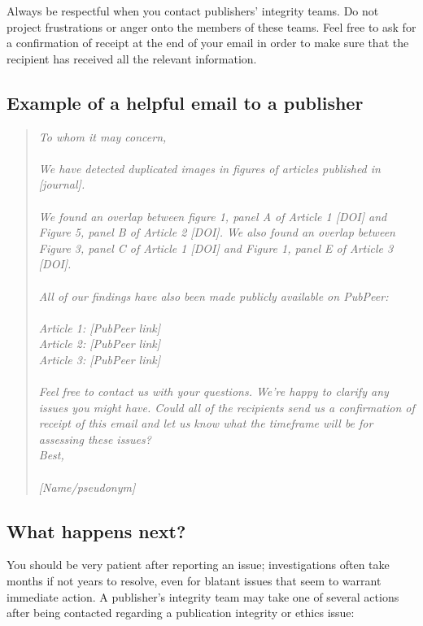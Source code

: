 \documentclass[letterpaper, 12pt]{article}
\begin{document}
Always be respectful when you contact publishers' integrity teams. Do not project frustrations or anger onto the members of these teams. Feel free to ask for a confirmation of receipt at the end of your email in order to make sure that the recipient has received all the relevant information.

\subsection*{Example of a helpful email to a publisher}

\begin{quote}
\textit{To whom it may concern,}\\
\indent\\
\textit{We have detected duplicated images in figures of articles published in [journal].}\\
\indent\\
\textit{We found an overlap between figure 1, panel A of Article 1 [DOI] and Figure 5, panel B of Article 2 [DOI]. We also found an overlap between Figure 3, panel C of Article 1 [DOI] and Figure 1, panel E of Article 3 [DOI].}\\
\indent\\
\textit{All of our findings have also been made publicly available on PubPeer:}\\
\indent\\
\textit{Article 1: [PubPeer link]\\
Article 2: [PubPeer link]\\
Article 3: [PubPeer link]\\}
\indent\\
\textit{Feel free to contact us with your questions. We’re happy to clarify any issues you might have. Could all of the recipients send us a confirmation of receipt of this email and let us know what the timeframe will be for assessing these issues?}\\
\indent
\textit{Best,}\\
\indent\\
\textit{[Name/pseudonym]}
\end{quote}

\subsection*{What happens next?}

You should be very patient after reporting an issue; investigations often take months if not years to resolve, even for blatant issues that seem to warrant immediate action. A publisher's integrity team may take one of several actions after being contacted regarding a publication integrity or ethics issue:
\end{document}
